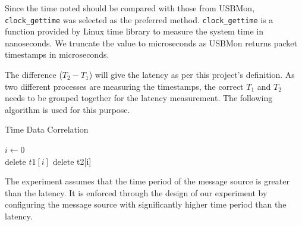 Since the time noted should be compared with those from USBMon, \texttt{clock\_{gettime}} was selected as the preferred method.
\texttt{clock\_{gettime}} is a function provided by Linux time library to measure the system time in nanoseconds.
We truncate the value to microseconds as USBMon returns packet timestamps in microseconds.

The difference ($T_2 - T_1$) will give the latency as per this project's definition.
As two different processes are measuring the timestamps, the correct $T_1$ and $T_2$ needs to be grouped together for the latency measurement. 
The following algorithm is used for this purpose.

\begin{algorithm}[!h]
\caption{Time Data Correlation}
\begin{algorithmic}
\State $i \gets 0$
 \\
\hspace{1.35cm} delete $t1[i]$
delete t2[i]
\EndIf
\EndFor
\end{algorithmic}
\end{algorithm}
The experiment assumes that the time period of the message source is greater than the latency.
It is enforced through the design of our experiment by configuring the message source with significantly higher time period than the latency.\\

